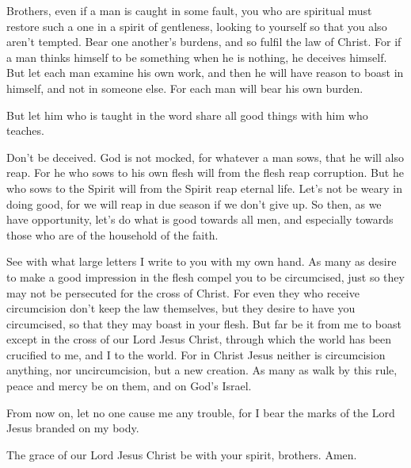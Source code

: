  Brothers, even if a man is caught in some fault, you who
are spiritual must restore such a one in a spirit of gentleness, looking
to yourself so that you also aren't tempted.  Bear one
another's burdens, and so fulfil the law of Christ.  For
if a man thinks himself to be something when he is nothing, he deceives
himself.  But let each man examine his own work, and then
he will have reason to boast in himself, and not in someone else.
 For each man will bear his own burden.

 But let him who is taught in the word share all good
things with him who teaches.

 Don't be deceived. God is not mocked, for whatever a man
sows, that he will also reap.  For he who sows to his own
flesh will from the flesh reap corruption. But he who sows to the Spirit
will from the Spirit reap eternal life.  Let's not be
weary in doing good, for we will reap in due season if we don't give up.
 So then, as we have opportunity, let's do what is good
towards all men, and especially towards those who are of the household
of the faith.

 See with what large letters I write to you with my own
hand.  As many as desire to make a good impression in the
flesh compel you to be circumcised, just so they may not be persecuted
for the cross of Christ.  For even they who receive
circumcision don't keep the law themselves, but they desire to have you
circumcised, so that they may boast in your flesh.  But
far be it from me to boast except in the cross of our Lord Jesus Christ,
through which the world has been crucified to me, and I to the world.
 For in Christ Jesus neither is circumcision anything,
nor uncircumcision, but a new creation.  As many as walk
by this rule, peace and mercy be on them, and on God's Israel.

 From now on, let no one cause me any trouble, for I bear
the marks of the Lord Jesus branded on my body.

 The grace of our Lord Jesus Christ be with your spirit,
brothers. Amen.
